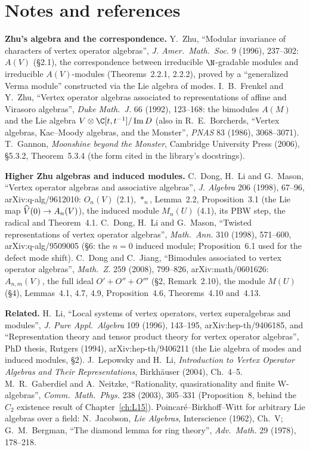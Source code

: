 \section{Notes and references}\label{l13:sec:notes}

\textbf{Zhu's algebra and the correspondence.} Y.~Zhu, ``Modular invariance of characters of vertex operator algebras'',
\emph{J. Amer.\ Math.\ Soc.} 9 (1996), 237--302: $A(V)$ (§2.1), the correspondence between irreducible $\N$-gradable modules and
irreducible $A(V)$-modules (Theorems~2.2.1, 2.2.2), proved by a ``generalized Verma module'' constructed via the Lie algebra of modes.
I.~B.~Frenkel and Y.~Zhu, ``Vertex operator algebras associated to representations of affine and Virasoro algebras'',
\emph{Duke Math.\ J.} 66 (1992), 123--168: the bimodules $A(M)$ and the Lie algebra $V\otimes\C[t,t^{-1}]/\operatorname{Im}D$ (also in
R.~E.~Borcherds, ``Vertex algebras, Kac--Moody algebras, and the Monster'', \emph{PNAS} 83 (1986), 3068--3071). T.~Gannon,
\emph{Moonshine beyond the Monster}, Cambridge University Press (2006), §5.3.2, Theorem~5.3.4 (the form cited in the library's
docstrings).

\textbf{Higher Zhu algebras and induced modules.} C.~Dong, H.~Li and G.~Mason, ``Vertex operator algebras and associative algebras'',
\emph{J. Algebra} 206 (1998), 67--96, arXiv:q-alg/9612010: $O_n(V)$ (2.1), $*_n$, Lemma~2.2, Proposition~3.1 (the Lie map
$\widehat{V}(0)\to A_n(V)$), the induced module $M_n(U)$ (4.1), its PBW step, the radical and Theorem~4.1. C.~Dong, H.~Li and
G.~Mason, ``Twisted representations of vertex operator algebras'', \emph{Math.\ Ann.} 310 (1998), 571--600, arXiv:q-alg/9509005
(§6: the $n=0$ induced module; Proposition~6.1 used for the defect mode shift). C.~Dong and C.~Jiang, ``Bimodules associated to vertex
operator algebras'', \emph{Math.\ Z.} 259 (2008), 799--826, arXiv:math/0601626: $A_{n,m}(V)$, the full ideal $O'+O''+O'''$
(§2, Remark~2.10), the module $M(U)$ (§4), Lemmas~4.1, 4.7, 4.9, Proposition~4.6, Theorems~4.10 and~4.13.

\textbf{Related.} H.~Li, ``Local systems of vertex operators, vertex superalgebras and modules'', \emph{J. Pure Appl.\ Algebra} 109 (1996),
143--195, arXiv:hep-th/9406185, and ``Representation theory and tensor product theory for vertex operator algebras'', PhD thesis,
Rutgers (1994), arXiv:hep-th/9406211 (the Lie algebra of modes and induced modules, §2). J.~Lepowsky and H.~Li, \emph{Introduction to
Vertex Operator Algebras and Their Representations}, Birkh\"auser (2004), Ch.~4--5. M.~R.~Gaberdiel and A.~Neitzke, ``Rationality,
quasirationality and finite W-algebras'', \emph{Comm.\ Math.\ Phys.} 238 (2003), 305--331 (Proposition~8, behind the $C_2$ existence
result of Chapter~\ref{ch:L15}). Poincar\'e--Birkhoff--Witt for arbitrary Lie algebras over a field: N.~Jacobson, \emph{Lie Algebras},
Interscience (1962), Ch.~V; G.~M.~Bergman, ``The diamond lemma for ring theory'', \emph{Adv.\ Math.} 29 (1978), 178--218.


